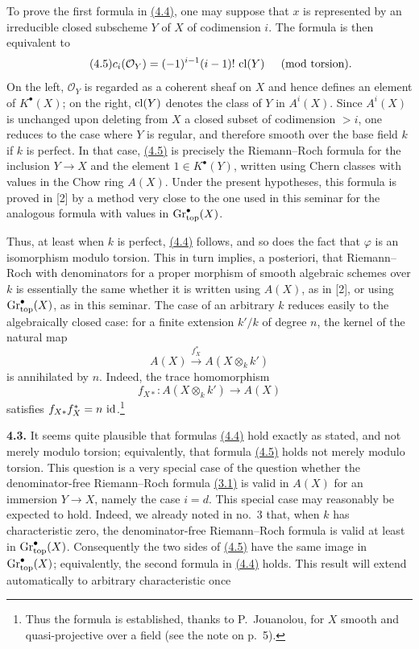 To prove the first formula in \hyperlink{sga6.e14.eq.4-4}{(4.4)}, one may suppose that $x$ is represented
by an irreducible closed subscheme $Y$ of $X$ of codimension $i$. The formula
is then equivalent to
\begin{equation*}\tag{4.5}
 c_i(\mathcal O_Y)=(-1)^{i-1}(i-1)!\,\operatorname{cl}(Y)
   \quad\pmod{\text{torsion}}.
\end{equation*}
On the left, $\mathcal O_Y$ is regarded as a coherent sheaf on $X$ and hence
defines an element of $K^\bullet(X)$; on the right, $\operatorname{cl}(Y)$ denotes the
class of $Y$ in $A^i(X)$. Since $A^i(X)$ is unchanged upon deleting from
$X$ a closed subset of codimension $>i$, one reduces to the case where $Y$
is regular, and therefore smooth over the base field $k$ if $k$ is perfect.
In that case, \hyperlink{sga6.e14.eq.4-5}{(4.5)} is precisely the Riemann--Roch formula for the inclusion
$Y\to X$ and the element $1\in K^\bullet(Y)$, written using Chern classes
with values in the Chow ring $A(X)$. Under the present hypotheses, this
formula is proved in [2] by a method very close to the one used in this
seminar for the analogous formula with values in $\operatorname{Gr}_{\mathrm{top}}^\bullet(X)$.

Thus, at least when $k$ is perfect, \hyperlink{sga6.e14.eq.4-4}{(4.4)} follows, and so does the fact that
$\varphi$ is an isomorphism modulo torsion. This in turn implies, a
posteriori, that Riemann--Roch with denominators for a proper morphism of
smooth algebraic schemes over $k$ is essentially the same whether it is
written using $A(X)$, as in [2], or using $\operatorname{Gr}_{\mathrm{top}}^\bullet(X)$, as in this
seminar. The case of an arbitrary $k$ reduces easily to the algebraically
closed case: for a finite extension $k'/k$ of degree $n$, the kernel of the
natural map
\[
 A(X)\xrightarrow{f_X^*}A(X\otimes_k k')
\]
is annihilated by $n$. Indeed, the trace homomorphism
\[
 f_{X*}:A(X\otimes_k k')\longrightarrow A(X)
\]
satisfies $f_{X*}f_X^*=n\,\operatorname{id}$.\footnote{Thus the formula is established,
thanks to P.~Jouanolou, for $X$ smooth and quasi-projective over a field (see
the note on p.~5).}

\noindent{}\textbf{4.3.}
It seems quite plausible that formulas \hyperlink{sga6.e14.eq.4-4}{(4.4)} hold exactly as stated, and not
merely modulo torsion; equivalently, that formula \hyperlink{sga6.e14.eq.4-5}{(4.5)} holds not merely
modulo torsion. This question is a very special case of the question whether
the denominator-free Riemann--Roch formula \hyperlink{sga6.e14.eq.3-1}{(3.1)} is valid in $A(X)$ for an
immersion $Y\to X$, namely the case $i=d$. This special case may reasonably
be expected to hold. Indeed, we already noted in no.~3 that, when $k$ has
characteristic zero, the denominator-free Riemann--Roch formula is valid at
least in $\operatorname{Gr}_{\mathrm{top}}^\bullet(X)$. Consequently the two sides of \hyperlink{sga6.e14.eq.4-5}{(4.5)} have the
same image in $\operatorname{Gr}_{\mathrm{top}}^\bullet(X)$; equivalently, the second formula in \hyperlink{sga6.e14.eq.4-4}{(4.4)}
holds. This result will extend automatically to arbitrary characteristic
once

